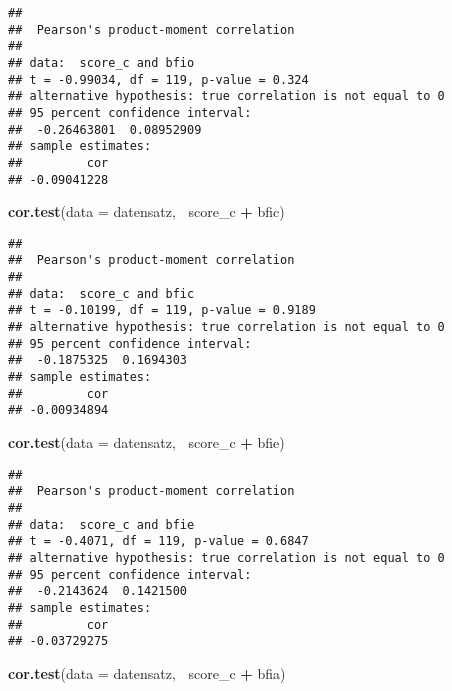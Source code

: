 \documentclass[]{article}
\newenvironment{Shaded}{\begin{snugshade}}{\end{snugshade}}
\newcommand{\KeywordTok}[1]{\textcolor[rgb]{0.13,0.29,0.53}{\textbf{#1}}}
\newcommand{\DataTypeTok}[1]{\textcolor[rgb]{0.13,0.29,0.53}{#1}}
\newcommand{\StringTok}[1]{\textcolor[rgb]{0.31,0.60,0.02}{#1}}
\newcommand{\OperatorTok}[1]{\textcolor[rgb]{0.81,0.36,0.00}{\textbf{#1}}}
\newcommand{\NormalTok}[1]{#1}
\begin{document}
\begin{verbatim}
## 
##  Pearson's product-moment correlation
## 
## data:  score_c and bfio
## t = -0.99034, df = 119, p-value = 0.324
## alternative hypothesis: true correlation is not equal to 0
## 95 percent confidence interval:
##  -0.26463801  0.08952909
## sample estimates:
##         cor 
## -0.09041228
\end{verbatim}

\begin{Shaded}
\begin{Highlighting}[]
\KeywordTok{cor.test}\NormalTok{(}\DataTypeTok{data =}\NormalTok{ datensatz, }\OperatorTok{~}\NormalTok{score_c }\OperatorTok{+}\StringTok{ }\NormalTok{bfic)}
\end{Highlighting}
\end{Shaded}

\begin{verbatim}
## 
##  Pearson's product-moment correlation
## 
## data:  score_c and bfic
## t = -0.10199, df = 119, p-value = 0.9189
## alternative hypothesis: true correlation is not equal to 0
## 95 percent confidence interval:
##  -0.1875325  0.1694303
## sample estimates:
##         cor 
## -0.00934894
\end{verbatim}

\begin{Shaded}
\begin{Highlighting}[]
\KeywordTok{cor.test}\NormalTok{(}\DataTypeTok{data =}\NormalTok{ datensatz, }\OperatorTok{~}\NormalTok{score_c }\OperatorTok{+}\StringTok{ }\NormalTok{bfie)}
\end{Highlighting}
\end{Shaded}

\begin{verbatim}
## 
##  Pearson's product-moment correlation
## 
## data:  score_c and bfie
## t = -0.4071, df = 119, p-value = 0.6847
## alternative hypothesis: true correlation is not equal to 0
## 95 percent confidence interval:
##  -0.2143624  0.1421500
## sample estimates:
##         cor 
## -0.03729275
\end{verbatim}

\begin{Shaded}
\begin{Highlighting}[]
\KeywordTok{cor.test}\NormalTok{(}\DataTypeTok{data =}\NormalTok{ datensatz, }\OperatorTok{~}\NormalTok{score_c }\OperatorTok{+}\StringTok{ }\NormalTok{bfia)}
\end{Highlighting}
\end{Shaded}
\end{document}
